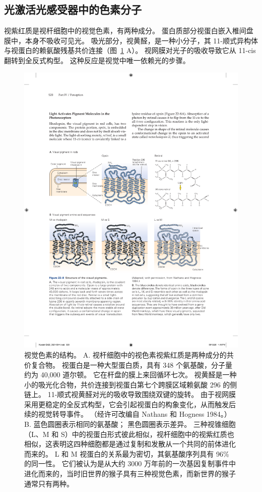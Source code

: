 \subsection{光激活光感受器中的色素分子}

视紫红质是视杆细胞中的视觉色素，有两种成分。
蛋白质部分视蛋白嵌入椎间盘膜中，本身不吸收可见光。 
吸光部分，视黄醛，是一种小分子，其 11-顺式异构体与视蛋白的赖氨酸残基共价连接（图~\ref{fig:22_8} A）。
视网膜对光子的吸收导致它从 11-cis 翻转到全反式构型。
这种反应是视觉中唯一依赖光的步骤。


\begin{figure}[htbp]
	\centering
	\includegraphics[width=1.0\linewidth]{chap22/fig_22_8}
	\caption{视觉色素的结构。 
		A. 视杆细胞中的视色素视紫红质是两种成分的共价复合物。 
		视蛋白是一种大型蛋白质，具有 348 个氨基酸，分子量约为 40,000 道尔顿。 
		它在杆盘的膜上来回循环七次。 
		视黄醛是一种小的吸光化合物，共价连接到视蛋白第七个跨膜区域赖氨酸 296 的侧链上。 
		11-顺式视黄醛对光的吸收导致围绕双键的旋转。 
		由于视网膜采用更稳定的全反式构型，它会引起视蛋白的构象变化，从而触发后续的视觉转导事件。 （经许可改编自 Nathans 和 Hogness 1984。） 
		B. 蓝色圆圈表示相同的氨基酸； 黑色圆圈表示差异。 三种视锥细胞（L、M 和 S）中的视蛋白形式彼此相似，视杆细胞中的视紫红质也相似，这表明这四种细胞都是通过复制和发散从一个共同的前体进化而来的。 L 和 M 视蛋白的关系最为密切，其氨基酸序列具有 96\% 的同一性。 
		它们被认为是从大约 3000 万年前的一次基因复制事件中进化而来的，当时旧世界的猴子具有三种视觉色素，而新世界的猴子通常只有两种。}
	\label{fig:22_8}
\end{figure}


